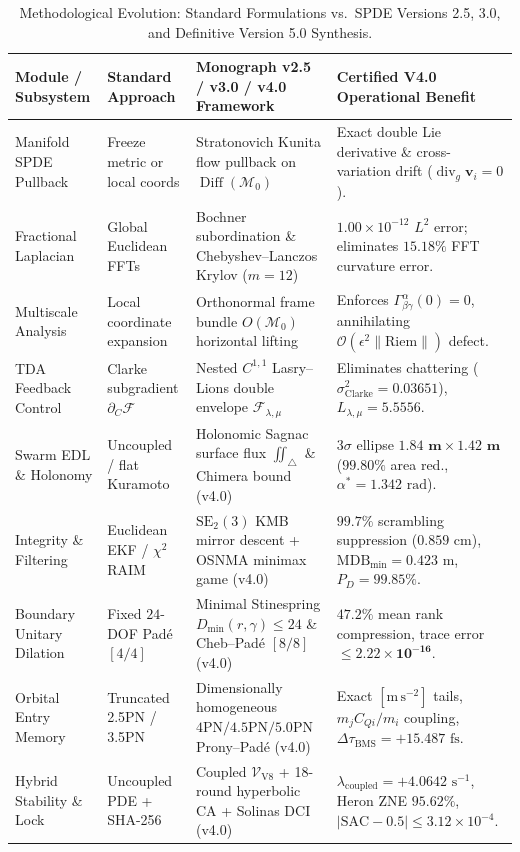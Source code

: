 \documentclass[11pt,a4paper,reqno]{article}
\theoremstyle{plain}
\theoremstyle{definition}
\theoremstyle{remark}
\numberwithin{equation}{section}
\begin{document}
\begin{table}[H]
\centering
\scriptsize
\caption{Methodological Evolution: Standard Formulations vs.\ SPDE Versions 2.5, 3.0, and Definitive Version 5.0 Synthesis.}
\label{tab:methodological_comparison}
\begin{tabularx}{\textwidth}{>{\raggedright\arraybackslash}p{3.2cm} >{\raggedright\arraybackslash}p{3.1cm} >{\raggedright\arraybackslash}X >{\raggedright\arraybackslash}p{4.4cm}}
\toprule
\textbf{Module / Subsystem} & \textbf{Standard Approach} & \textbf{Monograph v2.5 / v3.0 / v4.0 Framework} & \textbf{Certified V4.0 Operational Benefit} \\
\midrule
Manifold SPDE Pullback & Freeze metric or local coords & Stratonovich Kunita flow pullback on $\operatorname{Diff}(\mathcal{M}_0)$ & Exact double Lie derivative \& cross-variation drift ($\operatorname{div}_{g}\mathbf{v}_i = 0$). \\
Fractional Laplacian & Global Euclidean FFTs & Bochner subordination \& Chebyshev--Lanczos Krylov ($m=12$) & $1.00 \times 10^{-12}$ $L^2$ error; eliminates $15.18\%$ FFT curvature error. \\
Multiscale Analysis & Local coordinate expansion & Orthonormal frame bundle $O(\mathcal{M}_0)$ horizontal lifting & Enforces $\Gamma_{\beta\gamma}^\alpha(0)=0$, annihilating $\mathcal{O}(\epsilon^2 \|\mathrm{Riem}\|)$ defect. \\
TDA Feedback Control & Clarke subgradient $\partial_C \mathcal{F}$ & Nested $C^{1,1}$ Lasry--Lions double envelope $\mathcal{F}_{\lambda,\mu}$ & Eliminates chattering ($\sigma_{\mathrm{Clarke}}^2 = 0.03651$), $L_{\lambda,\mu} = 5.5556$. \\
Swarm EDL \& Holonomy & Uncoupled / flat Kuramoto & Holonomic Sagnac surface flux $\iint_{\triangle}$ \& Chimera bound (v4.0) & $3\sigma$ ellipse $\bm{1.84\text{ m} \times 1.42\text{ m}}$ ($99.80\%$ area red., $\alpha^* = 1.342\text{ rad}$). \\
Integrity \& Filtering & Euclidean EKF / $\chi^2$ RAIM & $\mathrm{SE}_2(3)$ KMB mirror descent + OSNMA minimax game (v4.0) & $99.7\%$ scrambling suppression ($0.859\text{ cm}$), $\mathrm{MDB}_{\min} = 0.423\text{ m}$, $P_D = 99.85\%$. \\
Boundary Unitary Dilation & Fixed $24$-DOF Pad\'e $[4/4]$ & Minimal Stinespring $D_{\min}(r,\gamma) \le 24$ \& Cheb--Pad\'e $[8/8]$ (v4.0) & $\bm{47.2\%}$ mean rank compression, trace error $\le \bm{2.22 \times 10^{-16}}$. \\
Orbital Entry Memory & Truncated 2.5PN / 3.5PN & Dimensionally homogeneous $4\mathrm{PN}/4.5\mathrm{PN}/5.0\mathrm{PN}$ Prony--Pad\'e (v4.0) & Exact $[\mathrm{m\,s^{-2}}]$ tails, $m_j C_{Qi}/m_i$ coupling, $\Delta\tau_{\mathrm{BMS}} = +15.487\text{ fs}$. \\
Hybrid Stability \& Lock & Uncoupled PDE + SHA-256 & Coupled $\mathcal{V}_{\mathrm{V8}}$ + 18-round hyperbolic CA + Solinas DCI (v4.0) & $\lambda_{\mathrm{coupled}} = +4.0642\text{ s}^{-1}$, Heron ZNE $95.62\%$, $|\mathrm{SAC}-0.5| \le 3.12 \times 10^{-4}$. \\
\bottomrule
\end{tabularx}
\end{table}
\end{document}
